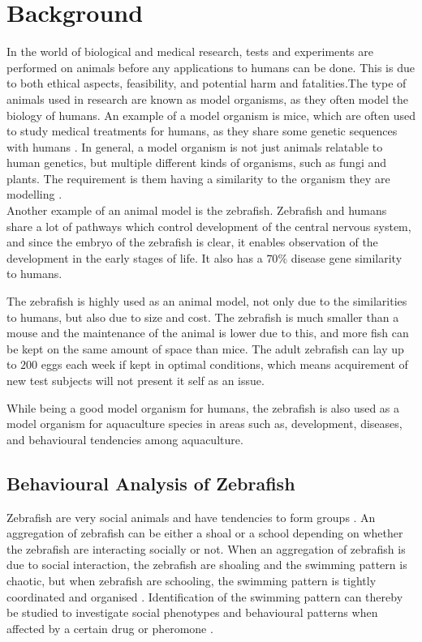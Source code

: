 \graphicspath{{figures/intro/}}
\chapter{Background}\label{ch:intro}
In the world of biological and medical research, tests and experiments are performed on animals before any applications to humans can be done. This is due to both ethical aspects, feasibility, and potential harm and fatalities.The type of animals used in research are known as model organisms, as they often model the biology of humans. An example of a model organism is mice, which are often used to study medical treatments for humans, as they share some genetic sequences with humans \citep{Perlman2016, RahmanKhan2018}. 
In general, a model organism is not just animals relatable to human genetics, but multiple different kinds of organisms, such as fungi and plants. The requirement is them having a similarity to the organism they are modelling \citep{Hedges2002}.\\

Another example of an animal model is the zebrafish. Zebrafish and humans share a lot of pathways which control development of the central nervous system, and since the embryo of the zebrafish is clear, it enables observation of the development in the early stages of life. It also has a $70\%$ disease gene similarity to humans. 

The zebrafish is highly used as an animal model, not only due to the similarities to humans, but also due to size and cost. The zebrafish is much smaller than a mouse and the maintenance of the animal is lower due to this, and more fish can be kept on the same amount of space than mice.
The adult zebrafish can lay up to $200$ eggs each week if kept in optimal conditions, which means acquirement of new test subjects will not present it self as an issue.

While being a good model organism for humans, the zebrafish is also used as a model organism for aquaculture species in areas such as, development, diseases, and behavioural tendencies among aquaculture.\\ 


\section{Behavioural Analysis of Zebrafish}
Zebrafish are very social animals and have tendencies to form groups \citep{RahmanKhan2018}. An aggregation of zebrafish can be either a shoal or a school depending on whether the zebrafish are interacting socially or not. When an aggregation of zebrafish is due to social interaction, the zebrafish are shoaling and the swimming pattern is chaotic, but when zebrafish are schooling, the swimming pattern is tightly coordinated and organised \citep{Miller2012a}. Identification of the swimming pattern can thereby be studied to investigate social phenotypes and behavioural patterns when affected by a certain drug or pheromone \citep{RahmanKhan2018}. 

